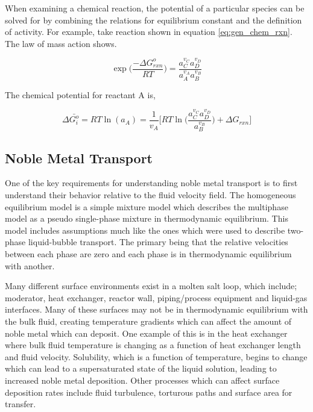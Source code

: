 When examining a chemical reaction, the potential of a particular species can be solved for by combining the relations for equilibrium constant and the definition of activity. For example, take reaction shown in equation \ref{eq:gen_chem_rxn}. The law of mass action shows.

 \begin{equation}
	\exp \bigg( \frac{-\Delta G_{rxn}^{o}}{RT} \bigg) = \frac{a_{C}^{v_{C}}a_{D}^{v_{D}}}{a_{A}^{v_{A}}a_{B}^{v_{B}}}
\end{equation}

The chemical potential for reactant A is,

 \begin{equation}
	\Delta \bar{G_{i}^{o}}  = RT\ln(a_{A}) = \frac{1}{v_{A}} \bigg[ RT\ln \bigg( \frac{a_{C}^{v_{C}}a_{D}^{v_{D}}}{a_{B}^{v_{B}}} \bigg) + \Delta G_{rxn} \bigg]
	\label{eq:chemical_potential_A}
\end{equation}

\subsection{Noble Metal Transport}

One of the key requirements for understanding noble metal transport is to first understand their behavior relative to the fluid velocity field. The homogeneous equilibrium model is a simple mixture model which describes the multiphase model as a pseudo single-phase mixture in thermodynamic equilibrium. This model includes assumptions much like the ones which were used to describe two-phase liquid-bubble transport. The primary being that the relative velocities between each phase are zero and each phase is in thermodynamic equilibrium with another. 

Many different surface environments exist in a molten salt loop, which include; moderator, heat exchanger, reactor wall, piping/process equipment and liquid-gas interfaces. Many of these surfaces may not be in thermodynamic equilibrium with the bulk fluid, creating temperature gradients which can affect the amount of noble metal which can deposit. One example of this is in the heat exchanger where bulk fluid temperature is changing as a function of heat exchanger length and fluid velocity. Solubility, which is a function of temperature, begins to change which can lead to a supersaturated state of the liquid solution, leading to increased noble metal deposition. Other processes which can affect surface deposition rates include fluid turbulence, torturous paths and surface area for transfer. 

